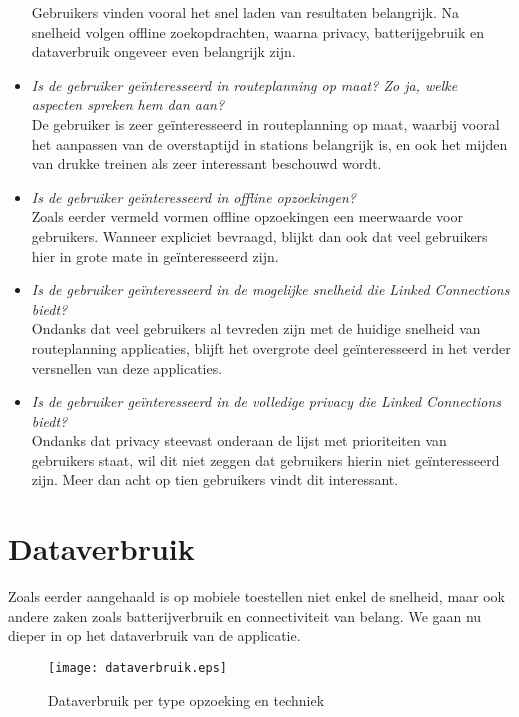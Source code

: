 \begin{itemize}
	Gebruikers vinden vooral het snel laden van resultaten belangrijk. Na snelheid volgen offline zoekopdrachten, waarna privacy, batterijgebruik en dataverbruik ongeveer even belangrijk zijn.
	\item \textit{Is de gebruiker geïnteresseerd in routeplanning op maat? Zo ja, welke aspecten spreken hem dan aan?}\\
	De gebruiker is zeer geïnteresseerd in routeplanning op maat, waarbij vooral het aanpassen van de overstaptijd in stations belangrijk is, en ook het mijden van drukke treinen als zeer interessant beschouwd wordt.
	\item \textit{Is de gebruiker geïnteresseerd in offline opzoekingen?}\\
	Zoals eerder vermeld vormen offline opzoekingen een meerwaarde voor gebruikers. Wanneer expliciet bevraagd, blijkt dan ook dat veel gebruikers hier in grote mate in geïnteresseerd zijn.
	\item \textit{Is de gebruiker geïnteresseerd in de mogelijke snelheid die Linked Connections biedt?}\\
	Ondanks dat veel gebruikers al tevreden zijn met de huidige snelheid van routeplanning applicaties, blijft het overgrote deel geïnteresseerd in het verder versnellen van deze applicaties.
	\item \textit{Is de gebruiker geïnteresseerd in de volledige privacy die Linked Connections biedt?}\\
	Ondanks dat privacy steevast onderaan de lijst met prioriteiten van gebruikers staat, wil dit niet zeggen dat gebruikers hierin niet geïnteresseerd zijn. Meer dan acht op tien gebruikers vindt dit interessant.
\end{itemize}

\section{Dataverbruik}
Zoals eerder aangehaald is op mobiele toestellen niet enkel de snelheid, maar ook andere zaken zoals batterijverbruik en connectiviteit van belang. We gaan nu dieper in op het dataverbruik van de applicatie. 

\begin{figure}[ht]
	\centering
	\texttt{[image: dataverbruik.eps]}
	\caption[Dataverbruik per opzoeking]{Dataverbruik per type opzoeking en techniek}
	\label{fig:dataUsage}
\end{figure}

